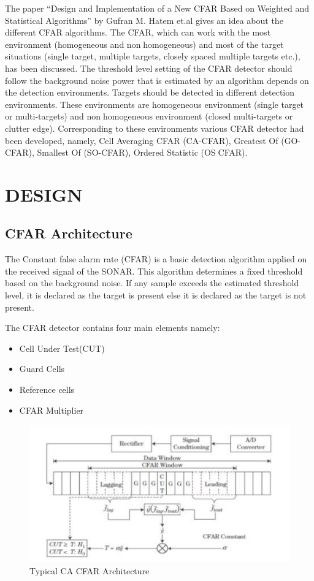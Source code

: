 \documentclass[10pt]{report}
\begin{document}
The paper “Design and Implementation of a New CFAR Based on Weighted and 
Statistical Algorithms” by Gufran M. Hatem et.al gives an idea about the different CFAR 
algorithms. The CFAR, which can work with the most environment (homogeneous and nonhomogeneous) and most of the target situations (single target, multiple targets, closely spaced 
multiple targets etc.), has been discussed. The threshold level setting of the CFAR detector 
should follow the background noise power that is estimated by an algorithm depends on the 
detection environments. Targets should be detected in different detection environments. These 
environments are homogeneous environment (single target or multi-targets) and nonhomogeneous environment (closed multi-targets or clutter edge). Corresponding to these 
environments various CFAR detector had been developed, namely, Cell Averaging CFAR 
(CA-CFAR), Greatest Of (GO-CFAR), Smallest Of (SO-CFAR), Ordered Statistic (OSCFAR).


\chapter {DESIGN}
\section{CFAR Architecture}
The Constant false alarm rate (CFAR) is a basic detection algorithm applied on the 
received signal of the SONAR. This algorithm determines a fixed threshold based on the 
background noise. If any sample exceeds the estimated threshold level, it is declared as the 
target is present else it is declared as the target is not present.

The CFAR detector contains four main elements namely:


\begin{itemize}
   \vspace{0.4cm}
   \item Cell Under Test(CUT)
   \vspace{0.4cm}
   \item Guard Cells
   \vspace{0.4cm}
   \item Reference cells
   \vspace{0.4cm}
   \item CFAR Multiplier 
 \end{itemize}
  \begin{figure}[h]
 	\centering
 	\includegraphics[scale=1]{c.jpg}
 	\caption{Typical CA CFAR Architecture}
 \end{figure}
\end{document}
